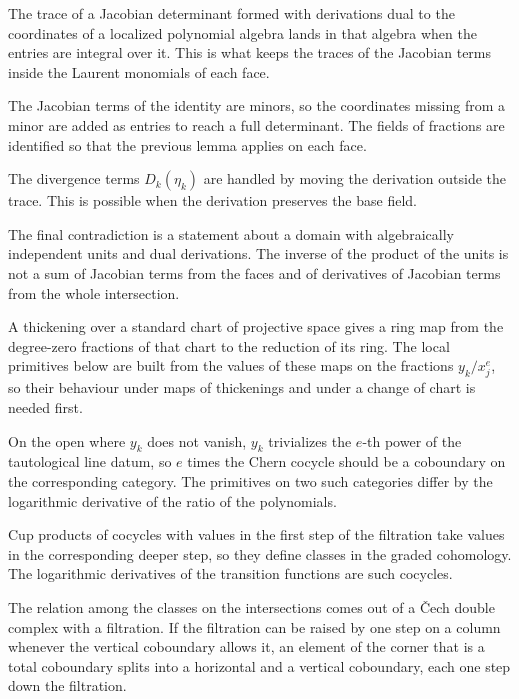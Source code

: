 The trace of a Jacobian determinant formed with derivations dual to the coordinates of a localized polynomial algebra
lands in that algebra when the entries are integral over it. This is what keeps the traces of the Jacobian terms
inside the Laurent monomials of each face.

The Jacobian terms of the identity are minors, so the coordinates missing from a minor are added as entries to reach a
full determinant. The fields of fractions are identified so that the previous lemma applies on each face.

The divergence terms $D_k(\eta_k)$ are handled by moving the derivation outside the trace. This is possible when the
derivation preserves the base field.

The final contradiction is a statement about a domain with algebraically independent units and dual derivations. The
inverse of the product of the units is not a sum of Jacobian terms from the faces and of derivatives of Jacobian terms
from the whole intersection.

A thickening over a standard chart of projective space gives a ring map from the degree-zero fractions of that chart to
the reduction of its ring. The local primitives below are built from the values of these maps on the fractions
$y_k/x_j^e$, so their behaviour under maps of thickenings and under a change of chart is needed first.

On the open where $y_k$ does not vanish, $y_k$ trivializes the $e$-th power of the tautological line datum, so $e$
times the Chern cocycle should be a coboundary on the corresponding category. The primitives on two such categories
differ by the logarithmic derivative of the ratio of the polynomials.

Cup products of cocycles with values in the first step of the filtration take values in the corresponding deeper step,
so they define classes in the graded cohomology. The logarithmic derivatives of the transition functions are such
cocycles.

The relation among the classes on the intersections comes out of a \v{C}ech double complex with a filtration. If the
filtration can be raised by one step on a column whenever the vertical coboundary allows it, an element of the corner
that is a total coboundary splits into a horizontal and a vertical coboundary, each one step down the filtration.


